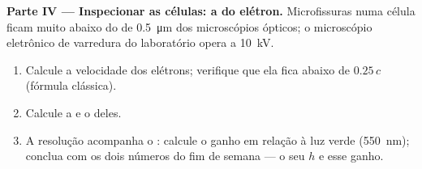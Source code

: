 \begin{problem}
\medskip
\noindent\textbf{Parte IV --- Inspecionar as células: a  do elétron.}
Microfissuras numa célula ficam muito abaixo do  de \qty{0.5}{\micro m} dos
microscópios ópticos; o microscópio eletrônico de varredura do laboratório opera a
\qty{10}{kV}.
\begin{enumerate}[resume]
  \item Calcule a velocidade dos elétrons; verifique que ela fica abaixo de $0.25\,c$
        (fórmula clássica).
  \item Calcule a  e o  deles.
  \item A resolução acompanha o : calcule o ganho em relação à luz
        verde (\qty{550}{nm}); conclua com os dois números do fim de semana --- o seu $h$
        e esse ganho.
\end{enumerate}
\end{problem}

